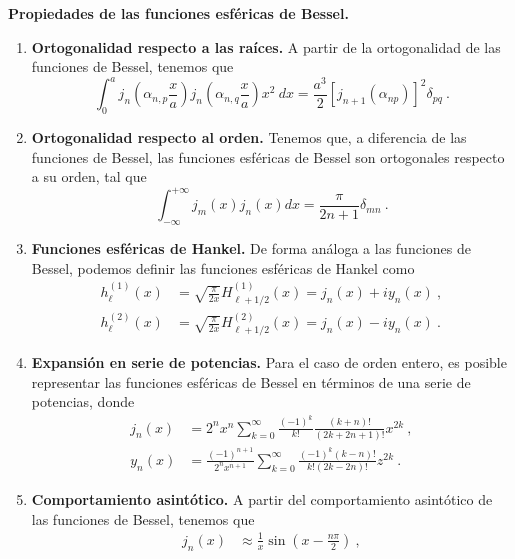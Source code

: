 \begin{propiedad}
    \textbf{Propiedades de las funciones esféricas de Bessel.}

    \begin{enumerate}
        \item \textbf{Ortogonalidad respecto a las raíces.} A partir de la ortogonalidad de las funciones de Bessel, tenemos que
        \begin{equation}
            \int_0^a j_n\left( \alpha_{n,p} \frac{x}{a} \right) j_n\left( \alpha_{n,q} \frac{x}{a}  \right) x^2 \ dx = \frac{a^3}{2} \left[ j_{n+1}(\alpha_{np}) \right]^2 \delta_{pq} \ .
        \end{equation}
        \item \textbf{Ortogonalidad respecto al orden.} Tenemos que, a diferencia de las funciones de Bessel, las funciones esféricas de Bessel son ortogonales respecto a su orden, tal que
        \begin{equation}
            \int_{-\infty}^{+\infty} j_m(x) j_n(x) dx = \frac{\pi}{2n+1} \delta_{mn} \ .
        \end{equation}
        \item \textbf{Funciones esféricas de Hankel.} De forma análoga a las funciones de Bessel, podemos definir las funciones esféricas de Hankel como
        \begin{align}
            h_\ell^{(1)}(x) & = \sqrt{\frac{\pi}{2x}}H_{\ell + 1/2}^{(1)}(x) = j_n(x) + i y_n(x) \ , \\
            h_\ell^{(2)}(x) & = \sqrt{\frac{\pi}{2x}}H_{\ell + 1/2}^{(2)}(x) = j_n(x) - i y_n(x) \ .
        \end{align}
        \item \textbf{Expansión en serie de potencias.} Para el caso de orden entero, es posible representar las funciones esféricas de Bessel en términos de una serie de potencias, donde
        \begin{align}
            j_n(x) & = 2^n x^n  \sum_{k=0}^\infty \frac{(-1)^k}{k!} \frac{(k+n)!}{(2k+2n+1)!}x^{2k} \ , \\
            y_n(x) & = \frac{(-1)^{n+1}}{2^n x^{n+1}} \sum_{k = 0}^\infty \frac{(-1)^k (k-n)!}{k! (2k-2n)!}z^{2k} \ .
        \end{align}
        \item \textbf{Comportamiento asintótico.} A partir del comportamiento asintótico de las funciones de Bessel, tenemos que
        \begin{align}
            j_n(x) & \approx \frac{1}{x} \sin\left( x - \frac{n\pi}{2} \right) \ , \\

\end{align}
\end{enumerate}
\end{propiedad}
